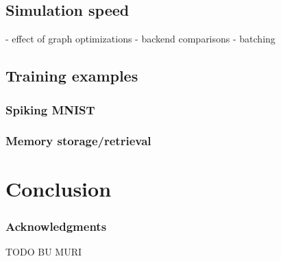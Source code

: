 \documentclass{article}
\begin{document}
\subsection{Simulation speed}

- effect of graph optimizations
- backend comparisons
- batching

\subsection{Training examples}

\subsubsection{Spiking MNIST}

\subsubsection{Memory storage/retrieval}

\section{Conclusion}

\subsubsection*{Acknowledgments}

TODO BU MURI

\small



\end{document}
